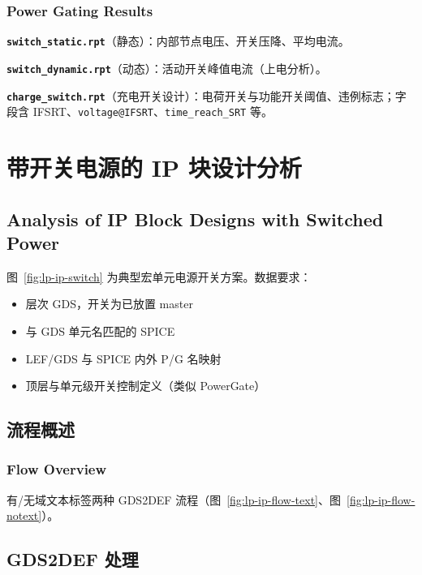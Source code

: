 \subsubsection*{Power Gating Results}

\textbf{\texttt{switch\_static.rpt}}（静态）：内部节点电压、开关压降、平均电流。

\textbf{\texttt{switch\_dynamic.rpt}}（动态）：活动开关峰值电流（上电分析）。

\textbf{\texttt{charge\_switch.rpt}}（充电开关设计）：电荷开关与功能开关阈值、违例标志；字段含 IFSRT、\texttt{voltage@IFSRT}、\texttt{time\_reach\_SRT} 等。

\section{带开关电源的 IP 块设计分析}
\subsection*{Analysis of IP Block Designs with Switched Power}

图~\ref{fig:lp-ip-switch} 为典型宏单元电源开关方案。数据要求：
\begin{itemize}
  \item 层次 GDS，开关为已放置 master
  \item 与 GDS 单元名匹配的 SPICE
  \item LEF/GDS 与 SPICE 内外 P/G 名映射
  \item 顶层与单元级开关控制定义（类似 PowerGate）
\end{itemize}


\subsection{流程概述}
\subsubsection*{Flow Overview}

有/无域文本标签两种 GDS2DEF 流程（图~\ref{fig:lp-ip-flow-text}、图~\ref{fig:lp-ip-flow-notext}）。



\subsection{GDS2DEF 处理}
